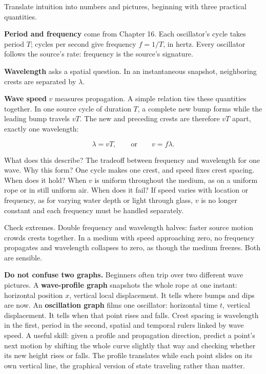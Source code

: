 
\begin{mainline}
Translate intuition into numbers and pictures, beginning with three practical quantities.

\textbf{Period and frequency} come from Chapter 16. Each oscillator's cycle takes period \(T\); cycles per second give frequency \(f=1/T\), in hertz. Every oscillator follows the source's rate: frequency is the source's signature.

\textbf{Wavelength} asks a spatial question. In an instantaneous snapshot, neighboring crests are separated by \(\lambda\).

\textbf{Wave speed} \(v\) measures propagation. A simple relation ties these quantities together. In one source cycle of duration \(T\), a complete new bump forms while the leading bump travels \(vT\). The new and preceding crests are therefore \(vT\) apart, exactly one wavelength:

\[
  \lambda = vT, \qquad \text{or} \qquad v = f\lambda .
\]

What does this describe? The tradeoff between frequency and wavelength for one wave. Why this form? One cycle makes one crest, and speed fixes crest spacing. When does it hold? When \(v\) is uniform throughout the medium, as on a uniform rope or in still uniform air. When does it fail? If speed varies with location or frequency, as for varying water depth or light through glass, \(v\) is no longer constant and each frequency must be handled separately.

Check extremes. Double frequency and wavelength halves: faster source motion crowds crests together. In a medium with speed approaching zero, no frequency propagates and wavelength collapses to zero, as though the medium freezes. Both are sensible.
\end{mainline}

\begin{mainline}
\textbf{Do not confuse two graphs.} Beginners often trip over two different wave pictures. A \textbf{wave-profile graph} snapshots the whole rope at one instant: horizontal position \(x\), vertical local displacement. It tells where bumps and dips are now. An \textbf{oscillation graph} films one oscillator: horizontal time \(t\), vertical displacement. It tells when that point rises and falls. Crest spacing is wavelength in the first, period in the second, spatial and temporal rulers linked by wave speed. A useful skill: given a profile and propagation direction, predict a point's next motion by shifting the whole curve slightly that way and checking whether its new height rises or falls. The profile translates while each point slides on its own vertical line, the graphical version of state traveling rather than matter.
\end{mainline}


